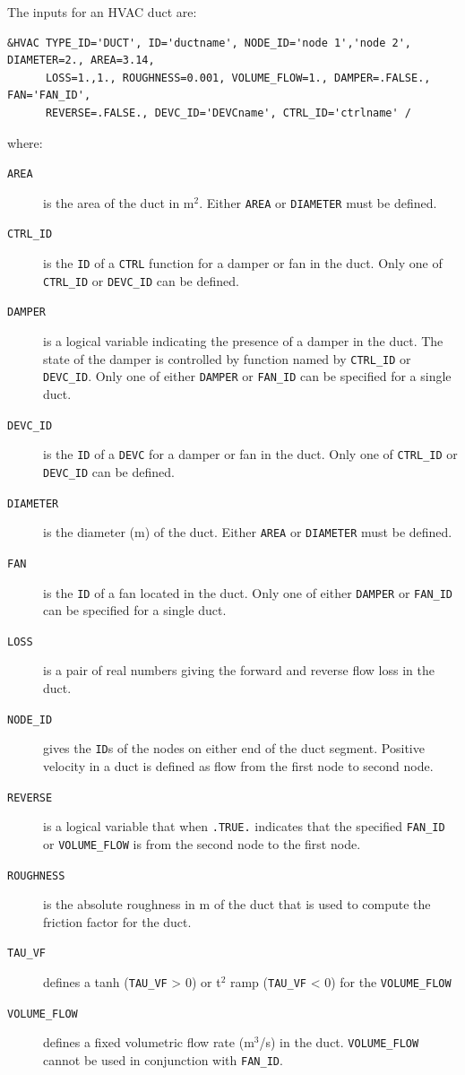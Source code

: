 \documentclass[11pt]{book}
\newcommand{\ct}{\tt\small}
\begin{document}
\noindent
The inputs for an HVAC duct are:

\footnotesize
\begin{verbatim}
&HVAC TYPE_ID='DUCT', ID='ductname', NODE_ID='node 1','node 2', DIAMETER=2., AREA=3.14,
      LOSS=1.,1., ROUGHNESS=0.001, VOLUME_FLOW=1., DAMPER=.FALSE., FAN='FAN_ID',
      REVERSE=.FALSE., DEVC_ID='DEVCname', CTRL_ID='ctrlname' /
\end{verbatim}\normalsize

\noindent
where:

\begin{description}
\item[{\ct AREA}] is the area of the duct in m$^2$. Either {\ct AREA} or {\ct DIAMETER} must be defined.
\item[{\ct CTRL\_ID}] is the {\ct ID} of a {\ct CTRL} function for a damper or fan in the duct.  Only one of {\ct CTRL\_ID} or {\ct DEVC\_ID} can be defined.
\item[{\ct DAMPER}] is a logical variable indicating the presence of a damper in the duct.  The state of the damper is controlled by
function named by {\ct CTRL\_ID} or {\ct DEVC\_ID}.  Only one of either {\ct DAMPER} or {\ct FAN\_ID} can be specified for a single duct.
\item[{\ct DEVC\_ID}]  is the {\ct ID} of a {\ct DEVC} for a damper or fan in the duct.  Only one of {\ct CTRL\_ID} or {\ct DEVC\_ID} can be defined.
\item[{\ct DIAMETER}]  is the diameter (m) of the duct. Either {\ct AREA} or {\ct DIAMETER} must be defined.
\item[{\ct FAN}] is the {\ct ID} of a fan located in the duct. Only one of either {\ct DAMPER} or {\ct FAN\_ID} can be specified for a single duct.
\item[{\ct LOSS}] is a pair of real numbers giving the forward and reverse flow loss in the duct.
\item[{\ct NODE\_ID}] gives the {\ct ID}s of the nodes on either end of the duct segment.  Positive velocity in a duct is defined as flow from the first node to second node.
\item[{\ct REVERSE}]  is a logical variable that when {\ct .TRUE.} indicates that the specified {\ct FAN\_ID} or {\ct VOLUME\_FLOW} is from the second node to the first node.
\item[{\ct ROUGHNESS}]  is the absolute roughness in m of the duct that is used to compute the friction factor for the duct.
\item[{\ct TAU\_VF}]  defines a tanh ({\ct TAU\_VF} > 0) or t$^2$ ramp ({\ct TAU\_VF} < 0) for the {\ct VOLUME\_FLOW}
\item[{\ct VOLUME\_FLOW}] defines a fixed volumetric flow rate (m$^3$/s) in the duct.  {\ct VOLUME\_FLOW} cannot be used in conjunction with {\ct FAN\_ID}.
\end{description}
\end{document}
